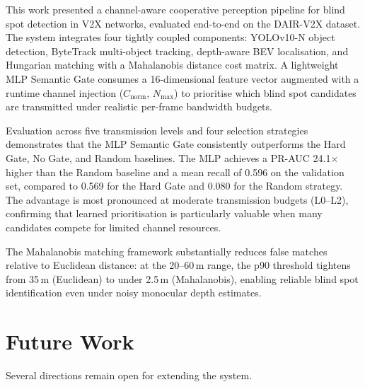 \documentclass[12pt]{article}
\begin{document}
This work presented a channel-aware cooperative perception pipeline for
blind spot detection in V2X networks, evaluated end-to-end on the
DAIR-V2X dataset.  The system integrates four tightly coupled
components: YOLOv10-N object detection, ByteTrack multi-object
tracking, depth-aware BEV localisation, and Hungarian matching with a
Mahalanobis distance cost matrix.  A lightweight MLP Semantic Gate
consumes a 16-dimensional feature vector augmented with a runtime
channel injection ($C_{\text{norm}}$, $N_{\max}$) to prioritise which
blind spot candidates are transmitted under realistic per-frame
bandwidth budgets.
 
\medskip
Evaluation across five transmission levels and four selection strategies
demonstrates that the MLP Semantic Gate consistently outperforms the
Hard Gate, No Gate, and Random baselines.  The MLP achieves a PR-AUC
24.1$\times$ higher than the Random baseline and a mean recall of 0.596
on the validation set, compared to 0.569 for the Hard Gate and 0.080
for the Random strategy.  The advantage is most pronounced at moderate
transmission budgets (L0--L2), confirming that learned prioritisation
is particularly valuable when many candidates compete for limited
channel resources.
 
\medskip
The Mahalanobis matching framework substantially reduces false matches
relative to Euclidean distance: at the 20--60\,m range, the p90
threshold tightens from 35\,m (Euclidean) to under 2.5\,m
(Mahalanobis), enabling reliable blind spot identification even under
noisy monocular depth estimates.
 
\section{Future Work}
 
Several directions remain open for extending the system.
 
\end{document}
